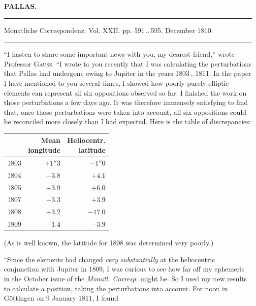 \clearpage{}\hypertarget{native-325-lower}{}\label{native-325-lower}
\begin{center}\textbf{PALLAS.}\par\vspace{4pt}\hrule\vspace{4pt}\fontsize{10}{12}\selectfont Monatliche Correspondenz. Vol. XXII. pp. 591\,..\,595. December 1810.\par\vspace{4pt}\hrule\vspace{4pt}\end{center}

\par\indent “I hasten to share some important news with you, my dearest friend,” wrote Professor \textsc{Gauss}. “I wrote to you recently that I was calculating the perturbations that Pallas had undergone owing to Jupiter in the years 1803\,..\,1811. In the paper I have mentioned to you several times, I showed how poorly purely elliptic elements can represent all six oppositions observed so far. I finished the work on those perturbations a few days ago. It was therefore immensely satisfying to find that, once those perturbations were taken into account, all six oppositions could be reconciled more closely than I had expected. Here is the table of discrepancies:

\begin{center}\fontsize{10}{12}\selectfont\setlength{\tabcolsep}{4pt}\renewcommand{\arraystretch}{1.15}\begin{tabular}{r|r|r}
 & \shortstack{Mean\\longitude} & \shortstack{Heliocentr.\\latitude}\\\hline
1803 & $+1''3$ & $-1''0$\\
1804 & $-3.8$ & $+4.1$\\
1805 & $+3.9$ & $+6.0$\\
1807 & $-3.3$ & $+3.9$\\
1808 & $+3.2$ & $-17.0$\\
1809 & $-1.4$ & $-3.9$\\
\end{tabular}\end{center}
\noindent (As is well known, the latitude for 1808 was determined very poorly.)

\par\indent “Since the elements had changed \emph{very substantially} at the heliocentric conjunction with Jupiter in 1809, I was curious to see how far off my ephemeris in the October issue of the \emph{Monatl. Corresp.} might be. So I used my new results to calculate a position, taking the perturbations into account. For noon in Göttingen on 9 January 1811, I found

